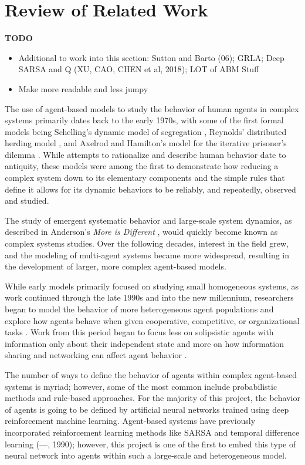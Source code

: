 \chapter{Review of Related Work}

\textbf{TODO}
\begin{itemize}
\item Additional to work into this section: Sutton and Barto (06); GRLA; Deep SARSA and Q (XU, CAO, CHEN et al, 2018); LOT of ABM Stuff
\item Make more readable and less jumpy
\end{itemize}

The use of agent-based models to study the behavior of human agents in complex 
systems primarily dates back to the early 1970s, with some of the first formal 
models being Schelling's dynamic model of segregation
\cite{schelling1971dynamic}, 
Reynolds' distributed herding model \cite{reynolds1987flocks}, 
and Axelrod and Hamilton's model for the iterative prisoner's dilemma 
\cite{axelrod1981evolution}.
While attempts to rationalize and describe human behavior date to antiquity, 
these models were among the first to demonstrate how reducing a complex system 
down to its elementary components and the simple rules that define it allows 
for its dynamic behaviors to be reliably, and repeatedly, observed and studied.

The study of emergent systematic behavior and large-scale system dynamics, 
as described in Anderson's \emph{More is Different} \cite{anderson1972more}, 
would quickly become known as complex systems studies.
Over the following decades, interest in the field grew, and the modeling of 
multi-agent systems became more widespread, resulting in the development of 
larger, more complex agent-based models.

While early models primarily focused on studying small homogeneous systems, 
as work continued through the late 1990s and into the new millennium, 
researchers began to model the behavior of more heterogeneous agent 
populations \cite{socsci00} 
and explore how agents behave when given cooperative, competitive, or 
organizational tasks \cite{comcol97}. 
Work from this period began to focus less on solipsistic agents with 
information only about their independent state and more on how information 
sharing and networking can affect agent behavior \cite{prietula1998simulating}.

The number of ways to define the behavior of agents within complex agent-based 
systems is myriad; 
however, some of the most common include probabilistic methods and rule-based 
approaches. 
For the majority of this project, the behavior of agents is going to be 
defined by artificial neural networks trained using deep reinforcement 
machine learning. 
Agent-based systems have previously incorporated reinforcement learning methods 
like SARSA and temporal difference learning (---, 1990); however, this project is one of the first to embed this type of neural network into agents within such a large-scale and heterogeneous model.

